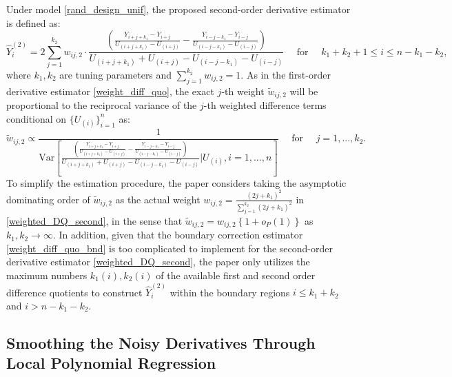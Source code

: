 \documentclass{uwstat572}
\theoremstyle{definition}
\renewcommand{\hat}{\widehat}
\renewcommand{\tilde}{\widetilde}
\theoremstyle{theorem}
\begin{document}
Under model \eqref{rand_design_unif}, the proposed second-order derivative estimator is defined as:
\begin{equation}
\label{weighted_DQ_second}
\hat{Y}_i^{(2)} = 2\sum_{j=1}^{k_2} w_{ij,2} \cdot \frac{\left(\frac{Y_{i+j+k_1} -Y_{i+j}}{U_{(i+j+k_1)} - U_{(i+j)}} - \frac{Y_{i-j-k_1} -Y_{i-j}}{U_{(i-j-k_1)} - U_{(i-j)}} \right)}{U_{(i+j+k_1)} + U_{(i+j)} - U_{(i-j-k_1)} -U_{(i-j)}} \quad \text{ for } \quad k_1+k_2 +1 \leq i\leq n-k_1-k_2,
\end{equation}
where $k_1,k_2$ are tuning parameters and $\sum_{j=1}^{k_2} w_{ij,2}=1$. As in the first-order derivative estimator \eqref{weight_diff_quo}, the exact $j$-th weight $\tilde{w}_{ij,2}$ will be proportional to the reciprocal variance of the $j$-th weighted difference terms conditional on $\{U_{(i)}\}_{i=1}^n$ as:
$$\tilde{w}_{ij,2} \propto \frac{1}{\mathrm{Var}\left[\frac{\left(\frac{Y_{i+j+k_1} -Y_{i+j}}{U_{(i+j+k_1)} - U_{(i+j)}} - \frac{Y_{i-j-k_1} -Y_{i-j}}{U_{(i-j-k_1)} - U_{(i-j)}} \right)}{U_{(i+j+k_1)} + U_{(i+j)} - U_{(i-j-k_1)} -U_{(i-j)}} \bigg| U_{(i)},i=1,...,n \right]} \quad \text{ for } \quad j=1,...,k_2.$$
To simplify the estimation procedure, the paper considers taking the asymptotic dominating order of $\tilde{w}_{ij,2}$ as the actual weight $w_{ij,2}=\frac{(2j+k_1)^2}{\sum_{j=1}^{k_2} (2j+k_1)^2}$ in \eqref{weighted_DQ_second}, in the sense that $\tilde{w}_{ij,2} = w_{ij,2}\left\{1+o_P(1)\right\}$ as $k_1,k_2 \to \infty$. In addition, given that the boundary correction estimator \eqref{weight_diff_quo_bnd} is too complicated to implement for the second-order derivative estimator \eqref{weighted_DQ_second}, the paper only utilizes the maximum numbers $k_1(i),k_2(i)$ of the available first and second order difference quotients to construct $\hat{Y}_i^{(2)}$ within the boundary regions $i\leq k_1+k_2$ and $i> n-k_1-k_2$. 

\subsection{Smoothing the Noisy Derivatives Through Local Polynomial Regression}
\label{Sec:loc_poly}
\end{document}
